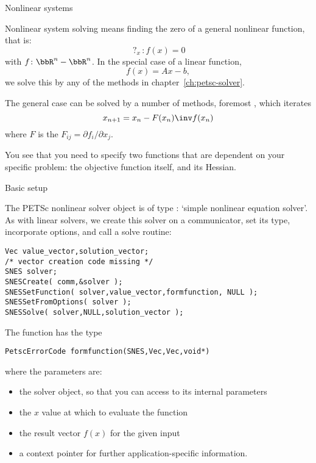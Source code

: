 
 {Nonlinear systems}

Nonlinear system solving means finding the zero of a general nonlinear function,
that is:
\[ \mathop{?}_x\colon f(x)=0 \]
with $f\colon \bbR^n-\bbR^n$.
In the special case of a linear function,
\[ f(x) = Ax-b, \]
we solve this by any of the methods in chapter~\ref{ch:petsc-solver}.

The general case can be solved by a number of methods,
foremost ,
which iterates
\[ x_{n+1} = x_n - F(x_n)\inv f(x_n) \]
where $F$ is the  $F_{ij}=\partial f_i/\partial x_j$.

You see that you need to specify two functions
that are dependent on your specific problem:
the objective function itself, and its Hessian.

 {Basic setup}

The PETSc nonlinear solver object is of type :
`simple nonlinear equation solver'.
As with linear solvers, we create this solver on a communicator,
set its type, incorporate options, and call a solve routine:
\begin{lstlisting}
Vec value_vector,solution_vector;
/* vector creation code missing */
SNES solver;
SNESCreate( comm,&solver );
SNESSetFunction( solver,value_vector,formfunction, NULL );
SNESSetFromOptions( solver );
SNESSolve( solver,NULL,solution_vector );
\end{lstlisting}

The function has the type
\begin{lstlisting}
PetscErrorCode formfunction(SNES,Vec,Vec,void*)
\end{lstlisting}
where the parameters are:
\begin{itemize}
\item the solver object, so that you can access to its internal parameters
\item the $x$ value at which to evaluate the function
\item the result vector $f(x)$ for the given input
\item a context pointer for further application-specific information.
\end{itemize}

